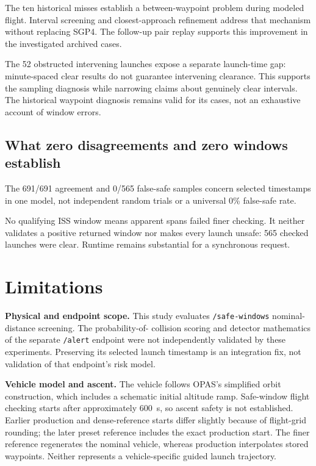 \documentclass[11pt,a4paper]{article}
\begin{document}
The ten historical misses establish a between-waypoint problem during
modeled flight. Interval screening and closest-approach refinement address
that mechanism without replacing SGP4. The follow-up pair replay supports
this improvement in the investigated archived cases.

The 52 obstructed intervening launches expose a separate launch-time gap:
minute-spaced clear results do not guarantee intervening clearance. This
supports the sampling diagnosis while narrowing claims about genuinely
clear intervals. The historical waypoint diagnosis remains valid for its
cases, not an exhaustive account of window errors.

\subsection{What zero disagreements and zero windows establish}

The 691/691 agreement and 0/565 false-safe samples concern selected
timestamps in one model, not independent random trials or a universal
0\% false-safe rate.

No qualifying ISS window means apparent spans failed finer checking.
It neither validates a positive returned window nor makes every launch
unsafe: 565 checked launches were clear. Runtime remains substantial
for a synchronous request.

\section{Limitations}
\label{sec:limitations}

\textbf{Physical and endpoint scope.} This study evaluates
\texttt{/safe-windows} nominal-distance screening. The probability-of-
collision scoring and detector mathematics of the separate
\texttt{/alert} endpoint were not independently validated by these
experiments. Preserving its selected launch timestamp is an integration
fix, not validation of that endpoint's risk model.

\textbf{Vehicle model and ascent.} The vehicle follows OPAS's simplified
orbit construction, which includes a schematic initial altitude ramp.
Safe-window flight checking starts after approximately 600~s, so ascent
safety is not established. Earlier production and dense-reference starts
differ slightly because of flight-grid rounding; the later preset reference includes the exact
production start. The finer reference regenerates the nominal vehicle,
whereas production interpolates stored waypoints.
Neither represents a vehicle-specific guided launch trajectory.
\end{document}
